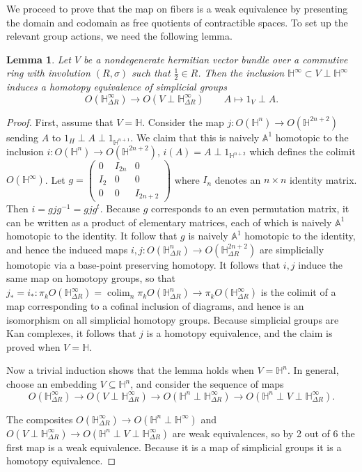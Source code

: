 \documentclass[draftthesis,tocnosub,noragright,centerchapter,10pt]{uiucthesis2009}
\newcommand{\mbb}{\mathbb}
\DeclareMathOperator*{\colim}{colim}
\theoremstyle{plain}
\newtheorem{lemma}{Lemma}
\theoremstyle{definition}
\begin{document}
We proceed to prove that the map on fibers is a weak equivalence by
presenting the domain and codomain as free quotients of contractible
spaces. To set up the relevant group actions, we need the following lemma.


\begin{lemma}\label{lem:incHE}
Let $V$ be a nondegenerate hermitian vector bundle over a commutive
ring with involution $(R,\sigma)$ such that $\frac{1}{2} \in R$. Then
the inclusion $\mbb H^\infty \subset V \perp \mbb H^\infty$ induces a
homotopy equivalence of simplicial groups
\[
O(\mbb H^\infty_{\Delta R}) \rightarrow O(V \perp \mbb
H^\infty_{\Delta R}) \qquad A \mapsto 1_V \perp A.
\]
\end{lemma}

\begin{proof}
First, assume that $V = \mbb H$. Consider the map $j : O(\mbb H^n)
\rightarrow O(\mbb H^{2n+2})$ sending $A$ to $1_H \perp A \perp
1_{\mbb H^{n+1}}$. We claim that this is naively $\mbb A^1$ homotopic
to the inclusion $i : O(\mbb H^n) \rightarrow O(\mbb H^{2n+2})$, $i(A)
= A \perp 1_{\mbb H^{n+2}}$ which defines the colimit $O(\mbb
H^\infty)$. Let $g = \begin{pmatrix}
0 & I_{2n} & 0 \\
I_2 & 0 & 0 \\
0 & 0 & I_{2n+2}
\end{pmatrix}$ where $I_n$ denotes an $n \times n$ identity
matrix. Then $i = gjg^{-1} = gjg^t$. Because $g$ corresponds to an
even permutation matrix, it can be written as a product of elementary
matrices, each of which is naively $\mbb A^1$ homotopic to the
identity. It follow that $g$ is naively $\mbb A^1$ homotopic to the
identity, and hence the induced maps $i,j : O(\mbb H^n_{\Delta R})
\rightarrow O(\mbb H^{2n+2}_{\Delta R})$ are simplicially homotopic
via a base-point preserving homotopy. It follows that $i,j$ induce the
same map on homotopy groups, so that $j_* = i_*: \pi_kO(\mbb
H^\infty_{\Delta R}) = \colim_n \pi_k O(\mbb H^n_{\Delta R})
\rightarrow \pi_k O(\mbb H^\infty_{\Delta R})$ is the colimit of a map
corresponding to a cofinal inclusion of diagrams, and hence is an
isomorphism on all simplicial homotopy groups. Because simplicial
groups are Kan complexes, it follows that $j$ is a homotopy
equivalence, and the claim is proved when $V = \mbb H$.

Now a trivial induction shows that the lemma holds when $V = \mbb
H^n$. In general, choose an embedding $V \subseteq \mbb H^n$, and
consider the sequence of maps
\[
O(\mbb H^\infty_{\Delta R}) \rightarrow O(V \perp \mbb
H^\infty_{\Delta R}) \rightarrow O(\mbb H^n \perp \mbb H_{\Delta R}^\infty)
\rightarrow O(\mbb H^n \perp V \perp \mbb H^\infty_{\Delta R}).
\]

The composites $O(\mbb H^\infty_{\Delta R}) \rightarrow O(\mbb H^n
\perp \mbb H^\infty)$ and $O(V \perp \mbb
H^\infty_{\Delta R}) \rightarrow O(\mbb H^n \perp V \perp \mbb
H^\infty_{\Delta R})$ are weak equivalences, so by 2 out of 6 the
first map is a weak equivalence. Because it is a map of simplicial
groups it is a homotopy equivalence. 
 
\end{proof}
\end{document}
